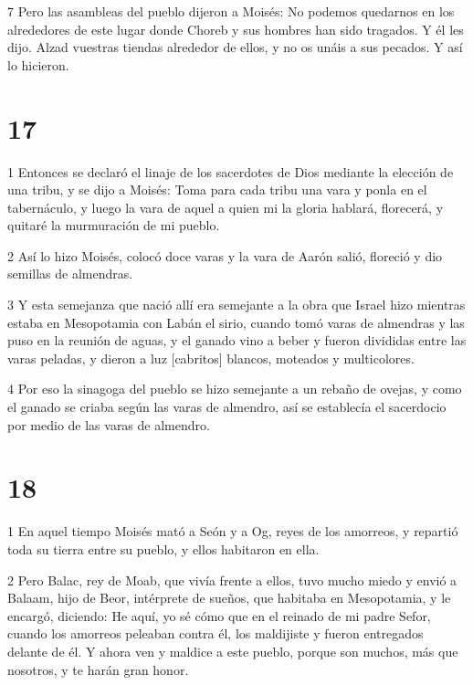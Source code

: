 \par 7 Pero las asambleas del pueblo dijeron a Moisés: No podemos quedarnos en los alrededores de este lugar donde Choreb y sus hombres han sido tragados. Y él les dijo. Alzad vuestras tiendas alrededor de ellos, y no os unáis a sus pecados. Y así lo hicieron.

\chapter{17}

\par 1 Entonces se declaró el linaje de los sacerdotes de Dios mediante la elección de una tribu, y se dijo a Moisés: Toma para cada tribu una vara y ponla en el tabernáculo, y luego la vara de aquel a quien mi la gloria hablará, florecerá, y quitaré la murmuración de mi pueblo.

\par 2 Así lo hizo Moisés, colocó doce varas y la vara de Aarón salió, floreció y dio semillas de almendras.

\par 3 Y esta semejanza que nació allí era semejante a la obra que Israel hizo mientras estaba en Mesopotamia con Labán el sirio, cuando tomó varas de almendras y las puso en la reunión de aguas, y el ganado vino a beber y fueron divididas entre las varas peladas, y dieron a luz [cabritos] blancos, moteados y multicolores.

\par 4 Por eso la sinagoga del pueblo se hizo semejante a un rebaño de ovejas, y como el ganado se criaba según las varas de almendro, así se establecía el sacerdocio por medio de las varas de almendro.

\chapter{18}

\par 1 En aquel tiempo Moisés mató a Seón y a Og, reyes de los amorreos, y repartió toda su tierra entre su pueblo, y ellos habitaron en ella.

\par 2 Pero Balac, rey de Moab, que vivía frente a ellos, tuvo mucho miedo y envió a Balaam, hijo de Beor, intérprete de sueños, que habitaba en Mesopotamia, y le encargó, diciendo: He aquí, yo sé cómo que en el reinado de mi padre Sefor, cuando los amorreos peleaban contra él, los maldijiste y fueron entregados delante de él. Y ahora ven y maldice a este pueblo, porque son muchos, más que nosotros, y te harán gran honor.

